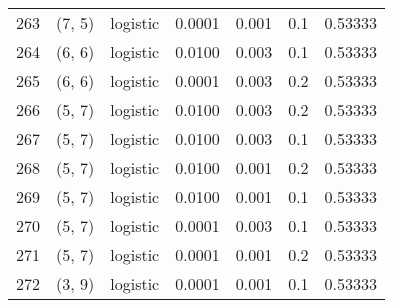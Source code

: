 \begin{tabular}{lllrrrr}
263 &      (7, 5) &  logistic &  0.0001 &  0.001 &  0.1 &   0.53333 \\
264 &      (6, 6) &  logistic &  0.0100 &  0.003 &  0.1 &   0.53333 \\
265 &      (6, 6) &  logistic &  0.0001 &  0.003 &  0.2 &   0.53333 \\
266 &      (5, 7) &  logistic &  0.0100 &  0.003 &  0.2 &   0.53333 \\
267 &      (5, 7) &  logistic &  0.0100 &  0.003 &  0.1 &   0.53333 \\
268 &      (5, 7) &  logistic &  0.0100 &  0.001 &  0.2 &   0.53333 \\
269 &      (5, 7) &  logistic &  0.0100 &  0.001 &  0.1 &   0.53333 \\
270 &      (5, 7) &  logistic &  0.0001 &  0.003 &  0.1 &   0.53333 \\
271 &      (5, 7) &  logistic &  0.0001 &  0.001 &  0.2 &   0.53333 \\
272 &      (3, 9) &  logistic &  0.0001 &  0.001 &  0.1 &   0.53333 \\
\bottomrule
\end{tabular}
